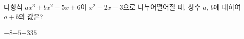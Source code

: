 다항식 $ax^3+bx^2-5x+6$이 $x^2-2x-3$으로 나누어떨어질 때, 상수 $a$, $b$에 대하여 $a+b$의 값은?
\begin{choices32}{$-8$}{$-5$}{$-3$}{$3$}{$5$}\end{choices32}
